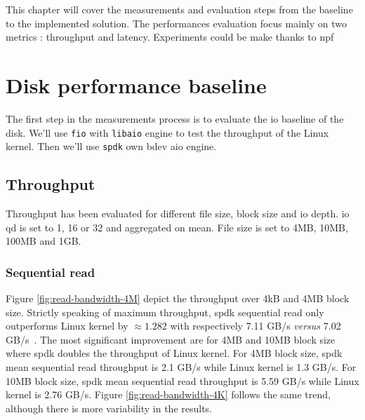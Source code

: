 This chapter will cover the measurements and evaluation steps from the baseline to the implemented solution. The performances evaluation focus mainly on two metrics : throughput and latency. Experiments could be make thanks to \acrfull{npf} \cite{barbette_tbarbettenpf_2026}


\section{Disk performance baseline}

The first step in the measurements process is to evaluate the \acrfull{io} baseline of the disk. We'll use \texttt{\acrfull{fio}} \cite{noauthor_kernelgitaxboefiogit_nodate} with \texttt{libaio} \cite{libaio} engine to test the throughput of the Linux kernel. Then we'll use \texttt{\acrshort{spdk}} own \acrshort{bdev} \acrfull{aio} engine.

\subsection{Throughput}


Throughput has been evaluated for different file size, block size and \acrshort{io} depth. \acrshort{io} \acrshort{qd} is set to 1, 16 or 32 and aggregated on mean.
File size is set to 4MB, 10MB, 100MB and 1GB. 


\subsubsection{Sequential read}

Figure \ref{fig:read-bandwidth-4M} depict the throughput over 4kB and 4MB block size.  Strictly speaking of maximum throughput, \acrshort{spdk} sequential read only outperforms Linux kernel by $\approx 1.282$ with respectively 7.11 GB/s \textit{versus} 7.02 GB/s~. The most significant improvement are for 4MB and 10MB block size where \acrshort{spdk} doubles the throughput of Linux kernel. For 4MB block size, \acrshort{spdk} mean sequential read throughput is 2.1 GB/s while Linux kernel is 1.3 GB/s. For 10MB block size, \acrshort{spdk} mean sequential read throughput is 5.59 GB/s while Linux kernel is 2.76 GB/s. Figure \ref{fig:read-bandwidth-4K} follows the same trend, although there is more variability in the results.

